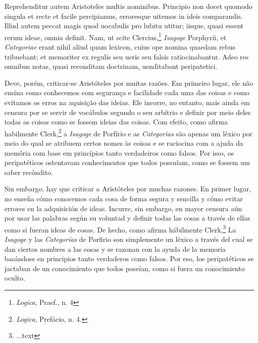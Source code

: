 \documentclass{article}
\begin{document}
\begin{paracol}{3}
\begin{nthcolumn}{2}
  \end{nthcolumn}
  \vspace{0.5cm}
  \begin{nthcolumn*}{0} %
    Reprehenditur autem Aristoteles multis nominibus. Principio non docet quomodo singula et recte et facile percipiamus, erroresque uitemos in ideis comparandis. Illud autem peccat magis quod uocabulis pro lubitu utitur; iisque, quasi essent rerum ideae, omnia definit. Nam, ut scite Clercius,\footnote[30]{\emph{Logica}, Praef., n. 4} \emph{Isagoge} Porphyrii, et \emph{Categoriae} erant nihil aliud quam lexicon, cuius ope nomina quaedam rebus tribuebant; et memoriter ex regulis seu ueris seu falsis ratiocinabantur. Adeo res omnibus notas,
quasi reconditam doctrinam, uenditabant peripatetici.
  \end{nthcolumn*}
  \vspace{0.5cm}
  \begin{nthcolumn}{1} %
    Deve, porém, criticar-se Aristóteles por muitas razões. Em primeiro lugar, ele não ensina como conhecemos com segurança e facilidade cada uma das coisas e como evitamos os erros na aquisição das ideias. Ele incorre, no entanto, mais ainda em censura por se servir de vocábulos segundo o seu arbítrio e definir por meio deles todas as coisas como se fossem ideias das coisas. Com efeito, como afirma habilmente Clerk,\footnote[30]{\emph{Logica}, Prefácio, n. 4.} a \emph{Isagoge} de Porfírio e as \emph{Categorias} são apenas um léxico por meio do qual se atribuem certos nomes às coisas e se raciocina com a ajuda da memória com base em princípios tanto verdadeiros como falsos. Por isso, os peripatéticos ostentavam conhecimentos que todos possuíam, como se fossem um saber recôndito.
  \end{nthcolumn}
  \vspace{0.5cm}
  \begin{nthcolumn}{2} %
    Sin embargo, hay que criticar a Aristóteles por muchas razones. En primer lugar, no enseña cómo conocemos cada cosa de forma segura y sencilla y cómo evitar errores en la adquisición de ideas. Incurre, sin embargo, en mayor censura aún por usar las palabras según su voluntad y definir todas las cosas a través de ellas como si fueran ideas de cosas. De hecho, como afirma hábilmente Clerk,\footnote[30]{...text} La \emph{Isagoge} y las \emph{Categorías} de Porfirio son simplemente un léxico a través del cual se dan ciertos nombres a las cosas y se razonan con la ayuda de la memoria basándose en principios tanto verdaderos como falsos. Por eso, los peripatéticos se jactaban de un conocimiento que todos poseían, como si fuera un conocimiento oculto.

\end{nthcolumn}
\end{paracol}
\end{document}
